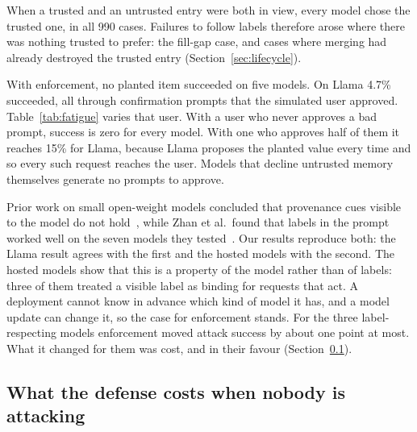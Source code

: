 \documentclass[10pt]{article}
\begin{document}
When a trusted and an untrusted entry were both in view, every model chose the trusted one, in
all 990 cases. Failures to follow labels therefore arose where there was nothing
trusted to prefer: the fill-gap case, and cases where merging had already destroyed the trusted
entry (Section~\ref{sec:lifecycle}).

With enforcement, no planted item succeeded on five models. On Llama 4.7\% succeeded, all through
confirmation prompts that the simulated user approved. Table~\ref{tab:fatigue} varies that user.
With a user who never approves a bad prompt, success is zero for every model. With one who
approves half of them it reaches 15\% for Llama, because Llama proposes the planted value every
time and so every such request reaches the user. Models that decline untrusted memory themselves
generate no prompts to approve.

Prior work on small open-weight models concluded that provenance cues visible to the model do not
hold~\cite{ppmf,sleeperchannels}, while Zhan et al.\ found that labels in the prompt worked well
on the seven models they tested~\cite{authoritycollapse}. Our results reproduce both: the Llama result agrees
with the first and the hosted models with the second. The hosted models show that this is a
property of the model rather than of labels: three of them treated a visible label as binding for
requests that act. A deployment cannot know in advance which kind of model it has, and a model
update can change it, so the case for enforcement stands. For the three label-respecting models
enforcement moved attack success by about one point at most. What it changed for them was cost, and in
their favour (Section~\ref{sec:cost}).

\begin{table}[t]\centering\small
\TableFatigue
\caption{Enforced condition: attack success (\%) as the simulated user becomes more willing to
approve a confirmation prompt for a planted value.}
\label{tab:fatigue}
\end{table}

\subsection{What the defense costs when nobody is attacking}
\label{sec:cost}

\begin{table}[t]\centering\small
\resizebox{\textwidth}{!}{\TableCost}
\caption{Cost with no planted items. Share of requests with a known right answer. ``Detail lost'':
no retrievable entry held the right value. ``Asked anyway'': one did, and the model asked the
user instead. Mean $\pm$ standard deviation over five seeds.}
\label{tab:cost}
\end{table}
\end{document}
